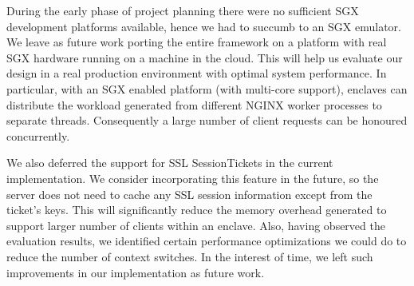 \documentclass[../main.tex]{subfiles}
\begin{document}
During the early phase of project planning there were no sufficient SGX
development platforms available, hence we had to succumb to an SGX emulator. We
leave as future work porting the entire framework on a platform with real SGX
hardware running on a machine in the cloud. This will help us evaluate our
design in a real production environment with optimal system performance. In
particular, with an SGX enabled platform (with multi-core support), enclaves
can distribute the workload generated from different NGINX worker processes to
separate threads. Consequently a large number of client requests can be
honoured concurrently.

We also deferred the support for SSL SessionTickets in the current
implementation. We consider incorporating this feature in the future, so the
server does not need to cache any SSL session information except from the
ticket's keys. This will significantly reduce the memory overhead generated to
support larger number of clients within an enclave. Also, having observed the
evaluation results, we identified certain performance optimizations we could do
to reduce the number of context switches. In the interest of time, we left
such improvements in our implementation as future work.
\end{document}
